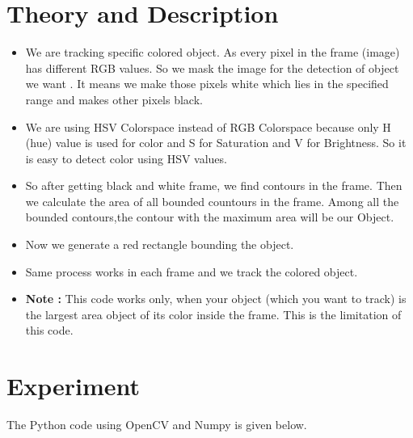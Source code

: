 \documentclass[11pt,a4paper]{article}
\begin{document}
	\section{Theory and Description}
	\begin{itemize}
		\item We are tracking specific colored object. As every pixel in the frame (image) has different RGB values. So we mask the image for the detection of object  we want . It means we make those pixels white which lies in the specified range and makes other pixels black.
		\item We are using HSV Colorspace instead of RGB Colorspace because only H (hue) value is used for color and S for Saturation and V for Brightness. So it is easy to detect color using HSV values.
		\item So after getting black and white frame, we find contours in the frame. Then we calculate the area of all bounded countours in the frame. Among all the bounded contours,the contour with the maximum area will be our Object. 
		\item Now we generate a red rectangle bounding the object.
		\item Same process works in each frame and we track the colored object.
		\item \textbf{Note :} This code works only, when your object (which you want to track) is the largest area object of its color inside the frame. This is the limitation of this code.
	\end{itemize}
	\section{Experiment}
	The Python code using OpenCV and Numpy is given below.
	\newline
	\newline
	
\end{document}
